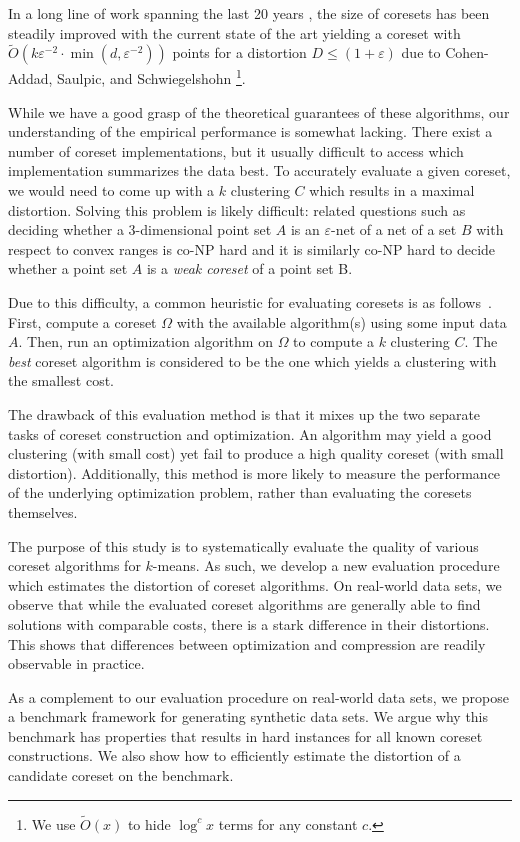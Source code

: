 In a long line of work spanning the last 20 years \cite{BecchettiBC0S19,BravermanJKW21,Chen09,FL11,FeldmanSS20,
HaM04,HaK07,huang2020coresets,BravermanJKW21,LS10,SohlerW18}, the size of coresets has been steadily improved with the current state of the art yielding a coreset with $\tilde{O}(k \varepsilon^{-2} \cdot \min(d,\varepsilon^{-2}))$ points for a distortion $D\leq (1+\varepsilon)$ due to Cohen-Addad, Saulpic, and Schwiegelshohn \cite{Cohen-AddadSS21}\footnote{We use $\tilde O(x)$ to hide $\log^c x$ terms for any constant $c$.}.

While we have a good grasp of the theoretical guarantees of these algorithms, our understanding of the empirical performance is somewhat lacking. There exist a number of coreset implementations, but it usually difficult to access which implementation summarizes the data best. To accurately evaluate a given coreset, we would need to come up with a $k$ clustering $C$ which results in a maximal distortion. Solving this problem is likely difficult: related questions such as deciding whether a 3-dimensional point set $A$ is an $\varepsilon$-net of a  net of a set $B$ with respect to convex ranges is co-NP hard and it is similarly co-NP hard to decide whether a point set $A$ is a \emph{weak coreset} of a point set B. 

Due to this difficulty, a common heuristic for evaluating coresets is as follows~\cite{AckermannMRSLS12,FGSSS13}. First, compute a coreset $\Omega$ with the available algorithm(s) using some input data $A$. Then, run an optimization algorithm on $\Omega$ to compute a $k$ clustering $C$. The \emph{best} coreset algorithm is considered to be the one which yields a clustering with the smallest cost.

The drawback of this evaluation method is that it mixes up the two separate tasks of coreset construction and optimization.
An algorithm may yield a good clustering (with small cost) yet fail to produce a high quality coreset (with small distortion).
Additionally, this method is more likely to measure the performance of the underlying optimization problem, rather than evaluating the coresets themselves.

The purpose of this study is to systematically evaluate the quality of various coreset algorithms for $k$-means. As such, we develop a new evaluation procedure which estimates the distortion of coreset algorithms. On real-world data sets, we observe that while the evaluated coreset algorithms are generally able to find solutions with comparable costs, there is a stark difference in their distortions. This shows that differences between optimization and compression are readily observable in practice.

As a complement to our evaluation procedure on real-world data sets, we propose a benchmark framework for generating synthetic data sets. We argue why this benchmark has properties that results in hard instances for all known coreset constructions. We also show how to efficiently estimate the distortion of a candidate coreset on the benchmark.


